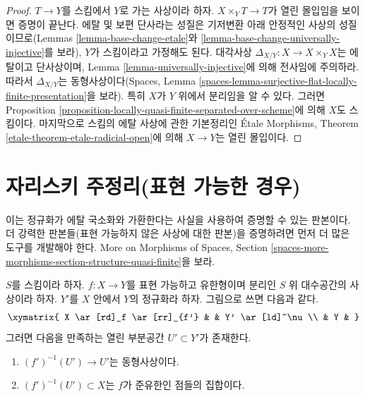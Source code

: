 \begin{proof}
$T \to Y$를 스킴에서 $Y$로 가는 사상이라 하자.
$X \times_Y T \to T$가 열린 몰입임을 보이면 증명이 끝난다. 에탈 및
보편 단사라는 성질은 기저변환 아래 안정적인 사상의 성질이므로(Lemmas
\ref{lemma-base-change-etale}와
\ref{lemma-base-change-universally-injective}를 보라), $Y$가 스킴이라고
가정해도 된다. 대각사상
$\Delta_{X/Y} : X \to X \times_Y X$는 에탈이고 단사상이며, Lemma
\ref{lemma-universally-injective}에 의해 전사임에 주의하라. 따라서
$\Delta_{X/Y}$는 동형사상이다(Spaces, Lemma
\ref{spaces-lemma-surjective-flat-locally-finite-presentation}을 보라).
특히 $X$가 $Y$ 위에서 분리임을 알 수 있다. 그러면 Proposition
\ref{proposition-locally-quasi-finite-separated-over-scheme}에 의해
$X$도 스킴이다. 마지막으로 스킴의 에탈 사상에 관한 기본정리인
\'Etale Morphisms, Theorem \ref{etale-theorem-etale-radicial-open}에 의해
$X \to Y$는 열린 몰입이다.
\end{proof}

\section{자리스키 주정리(표현 가능한 경우)}
\label{section-Zariski}

\noindent
이는 정규화가 에탈 국소화와 가환한다는 사실을 사용하여 증명할 수 있는
판본이다. 더 강력한 판본들(표현 가능하지 않은 사상에 대한 판본)을
증명하려면 먼저 더 많은 도구를 개발해야 한다. More on Morphisms of
Spaces, Section
\ref{spaces-more-morphisms-section-structure-quasi-finite}을 보라.

\begin{lemma}
\label{lemma-finite-type-separated}
$S$를 스킴이라 하자. $f : X \to Y$를 표현 가능하고 유한형이며 분리인
$S$ 위 대수공간의 사상이라 하자. $Y'$를 $X$ 안에서 $Y$의 정규화라 하자.
그림으로 쓰면 다음과 같다.
$$
\xymatrix{
X \ar[rd]_f \ar[rr]_{f'} & & Y' \ar[ld]^\nu \\
& Y &
}
$$
그러면 다음을 만족하는 열린 부분공간 $U' \subset Y'$가 존재한다.
\begin{enumerate}
\item $(f')^{-1}(U') \to U'$는 동형사상이다.
\item $(f')^{-1}(U') \subset X$는 $f$가 준유한인 점들의 집합이다.
\end{enumerate}
\end{lemma}

